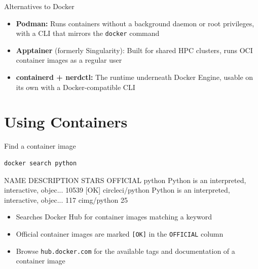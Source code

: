 \documentclass[aspectratio=169]{beamer}
\begin{document}
\begin{frame}{Alternatives to Docker}
  \begin{itemize}
    \item \textbf{Podman:} Runs containers without a background daemon or root privileges, with a CLI that mirrors the \texttt{docker} command
    \item \textbf{Apptainer} (formerly Singularity): Built for shared HPC clusters, runs OCI container images as a regular user
    \item \textbf{containerd + nerdctl:} The runtime underneath Docker Engine, usable on its own with a Docker-compatible CLI
  \end{itemize}

\note{
}
\end{frame}


\section{Using Containers}


\begin{frame}[fragile]{Find a container image}
  \begin{verbatim}
docker search python
  \end{verbatim}
  \begin{cmdoutput}
NAME              DESCRIPTION                                       STARS     OFFICIAL
python            Python is an interpreted, interactive, objec...   10539     [OK]
circleci/python   Python is an interpreted, interactive, objec...   117
cimg/python                                                         25
  \end{cmdoutput}

  \begin{itemize}
    \item Searches Docker Hub for container images matching a keyword
    \item Official container images are marked \texttt{[OK]} in the \texttt{OFFICIAL} column
    \item Browse \texttt{hub.docker.com} for the available tags and documentation of a container image
  \end{itemize}

\note{
}
\end{frame}
\end{document}
